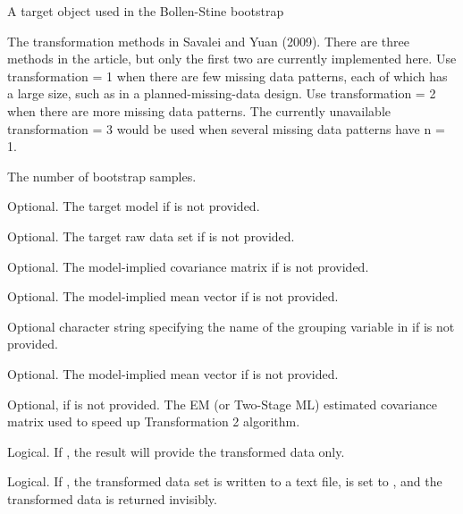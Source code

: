 \documentclass[a4paper]{book}
\begin{document}
%
\begin{Arguments}
\begin{ldescription}
\item[\code{x}] 
A target  object used in the Bollen-Stine bootstrap

\item[\code{transformation}] 
The transformation methods in Savalei and Yuan (2009). There are three methods in the article, but only the first two are currently implemented here.  Use transformation = 1 when there are few missing data patterns, each of which has a large size, such as in a planned-missing-data design.  Use transformation = 2 when there are more missing data patterns.  The currently unavailable transformation = 3 would be used when several missing data patterns have n = 1.

\item[\code{nBoot}] 
The number of bootstrap samples.

\item[\code{model}] 
Optional. The target model if  is not provided.

\item[\code{rawData}] 
Optional. The target raw data set if  is not provided.

\item[\code{Sigma}] 
Optional. The model-implied covariance matrix if  is not provided.

\item[\code{Mu}] 
Optional. The model-implied mean vector if  is not provided.

\item[\code{group}] 
Optional character string specifying the name of the grouping variable in  if  is not provided.

\item[\code{ChiSquared}] 
Optional. The model-implied mean vector if  is not provided.

\item[\code{EMcov}] 
Optional, if  is not provided. The EM (or Two-Stage ML) estimated covariance matrix used to speed up Transformation 2 algorithm.

\item[\code{transDataOnly}] 
Logical. If , the result will provide the transformed data only.

\item[\code{writeTransData}] 
Logical. If , the transformed data set is written to a text file,  is set to , and the transformed data is returned invisibly.


\end{ldescription}
\end{Arguments}
\end{document}
